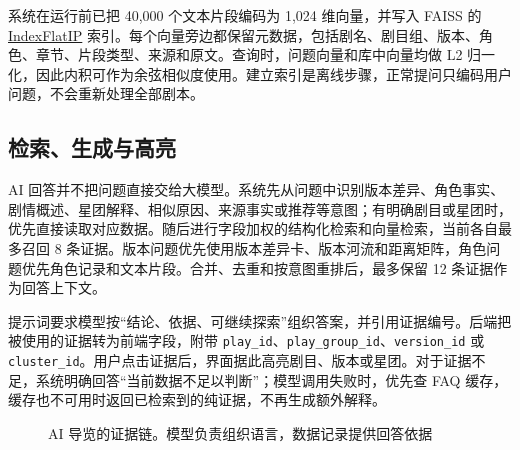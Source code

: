 \documentclass[12pt,a4paper]{article}
\begin{document}
系统在运行前已把 40,000 个文本片段编码为 1,024 维向量，并写入 FAISS 的 \url{IndexFlatIP} 索引。每个向量旁边都保留元数据，包括剧名、剧目组、版本、角色、章节、片段类型、来源和原文。查询时，问题向量和库中向量均做 L2 归一化，因此内积可作为余弦相似度使用。建立索引是离线步骤，正常提问只编码用户问题，不会重新处理全部剧本。

\subsection{检索、生成与高亮}
AI 回答并不把问题直接交给大模型。系统先从问题中识别版本差异、角色事实、剧情概述、星团解释、相似原因、来源事实或推荐等意图；有明确剧目或星团时，优先直接读取对应数据。随后进行字段加权的结构化检索和向量检索，当前各自最多召回 8 条证据。版本问题优先使用版本差异卡、版本河流和距离矩阵，角色问题优先角色记录和文本片段。合并、去重和按意图重排后，最多保留 12 条证据作为回答上下文。

提示词要求模型按“结论、依据、可继续探索”组织答案，并引用证据编号。后端把被使用的证据转为前端字段，附带 \texttt{play\_id}、\texttt{play\_group\_id}、\texttt{version\_id} 或 \texttt{cluster\_id}。用户点击证据后，界面据此高亮剧目、版本或星团。对于证据不足，系统明确回答“当前数据不足以判断”；模型调用失败时，优先查 FAQ 缓存，缓存也不可用时返回已检索到的纯证据，不再生成额外解释。

\begin{figure}[H]
  \centering
  \caption{AI 导览的证据链。模型负责组织语言，数据记录提供回答依据}
  \label{fig:ragflow}
\end{figure}
\end{document}

